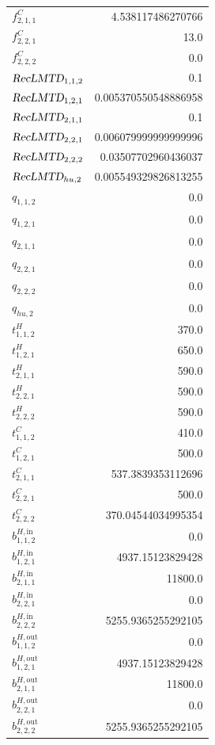 \documentclass{article}%
\begin{document}
\begin{multicols*}{3}
\begin{supertabular}{lr}
	$f_{2,1,1}^{C}$ & 4.538117486270766 \\%
	$f_{2,2,1}^{C}$ & 13.0 \\%
	$f_{2,2,2}^{C}$ & 0.0 \\%
	$\textsl{RecLMTD}_{1,1,2}$ & 0.1 \\%
	$\textsl{RecLMTD}_{1,2,1}$ & 0.005370550548886958 \\%
	$\textsl{RecLMTD}_{2,1,1}$ & 0.1 \\%
	$\textsl{RecLMTD}_{2,2,1}$ & 0.006079999999999996 \\%
	$\textsl{RecLMTD}_{2,2,2}$ & 0.03507702960436037 \\%
	$\textsl{RecLMTD}_{hu,2}$ & 0.005549329826813255 \\%
	$q_{1,1,2}$ & 0.0 \\%
	$q_{1,2,1}$ & 0.0 \\%
	$q_{2,1,1}$ & 0.0 \\%
	$q_{2,2,1}$ & 0.0 \\%
	$q_{2,2,2}$ & 0.0 \\%
	$q_{hu,2}$ & 0.0 \\%
	$t_{1,1,2}^{H}$ & 370.0 \\%
	$t_{1,2,1}^{H}$ & 650.0 \\%
	$t_{2,1,1}^{H}$ & 590.0 \\%
	$t_{2,2,1}^{H}$ & 590.0 \\%
	$t_{2,2,2}^{H}$ & 590.0 \\%
	$t_{1,1,2}^{C}$ & 410.0 \\%
	$t_{1,2,1}^{C}$ & 500.0 \\%
	$t_{2,1,1}^{C}$ & 537.3839353112696 \\%
	$t_{2,2,1}^{C}$ & 500.0 \\%
	$t_{2,2,2}^{C}$ & 370.04544034995354 \\%
	$b_{1,1,2}^{H,\text{in}}$ & 0.0 \\%
	$b_{1,2,1}^{H,\text{in}}$ & 4937.15123829428 \\%
	$b_{2,1,1}^{H,\text{in}}$ & 11800.0 \\%
	$b_{2,2,1}^{H,\text{in}}$ & 0.0 \\%
	$b_{2,2,2}^{H,\text{in}}$ & 5255.9365255292105 \\%
	$b_{1,1,2}^{H,\text{out}}$ & 0.0 \\%
	$b_{1,2,1}^{H,\text{out}}$ & 4937.15123829428 \\%
	$b_{2,1,1}^{H,\text{out}}$ & 11800.0 \\%
	$b_{2,2,1}^{H,\text{out}}$ & 0.0 \\%
	$b_{2,2,2}^{H,\text{out}}$ & 5255.9365255292105 \\%

\end{supertabular}
\end{multicols*}
\end{document}
